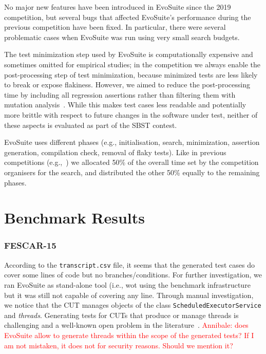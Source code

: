 \documentclass[sigconf]{acmart}
\newcommand{\EVOSUITE}{{\sc EvoSuite}\xspace}
\begin{document}
No major new features have been introduced in \EVOSUITE since the 2019 competition, but several bugs that affected \EVOSUITE's performance during the previous competition have been fixed. In particular, there were several problematic cases when \EVOSUITE was run using very small search budgets.

The test minimization step used by \EVOSUITE is computationally expensive and
sometimes omitted for empirical studies; in the competition we always enable
the post-processing step of test minimization, because minimized tests are less
likely to break or expose flakiness. However, we aimed to reduce the
post-processing time by including all regression assertions rather than
filtering them with mutation analysis~\cite{10.1109/TSE.2011.93}. While this
makes test cases less readable and potentially more brittle with respect to
future changes in the software under test, neither of these aspects is
evaluated as part of the SBST contest.

\EVOSUITE uses different phases (e.g., initialisation, search, minimization,
assertion generation, compilation check, removal of flaky tests). Like in
previous competitions (e.g.,~\cite{evosuiteAtSbst2016}) we allocated 50\% of
the overall time set by the competition organisers for the search, and
distributed the other 50\% equally to the remaining phases.



\section{Benchmark Results}


\begin{table*}[t]
  \centering
  \caption{\label{table:results}Detailed results of \EVOSUITE on the
    SBST benchmark classes.}
\vspace{-1em}
\resizebox{0.8\textwidth}{!}{  

}	
\end{table*}


\subsubsection*{FESCAR-15} According to the \texttt{transcript.csv} file, it
seems that the generated test cases do cover some lines of code but no
branches/conditions.  
For further investigation, we ran \EVOSUITE as stand-alone tool (i.e., wot using the benchmark infrastructure but it was still not capable of covering any line. Through manual investigation, we notice that the CUT manages objects of the class \texttt{ScheduledExecutorService} and \textit{threads}. Generating tests for CUTs that produce or manage threads is challenging and a well-known open problem in the literature~\cite{FrA13a}.
\textcolor{red}{Annibale: does EvoSuite allow to generate threads within the scope of the generated tests? If I am not mistaken, it does not for security reasons. Should we mention it?
}
\end{document}

